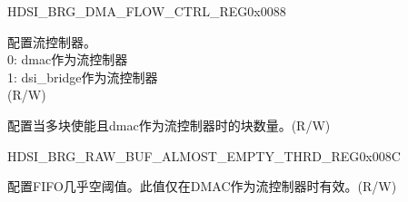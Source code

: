 \begin{register}{H}{DSI\_BRG\_DMA\_FLOW\_CTRL\_REG}{0x0088}\label{regdesc:DSIBRGDMAFLOWCTRLREG}
%
%
%
%
\regnewline%
\begin{regdesc}\begin{reglist}
\label{fielddesc:DSIBRGDSIDMAFLOWCONTROLLER}\item [DSI\_BRG\_DSI\_DMA\_FLOW\_CONTROLLER] 配置流控制器。\\0: dmac作为流控制器\\1: dsi\_bridge作为流控制器 \\(R/W)
\label{fielddesc:DSIBRGDMAFLOWMULTIBLKNUM}\item [DSI\_BRG\_DMA\_FLOW\_MULTIBLK\_NUM] 配置当多块使能且dmac作为流控制器时的块数量。(R/W)
\end{reglist}\end{regdesc}
\end{register}


\begin{register}{H}{DSI\_BRG\_RAW\_BUF\_ALMOST\_EMPTY\_THRD\_REG}{0x008C}\label{regdesc:DSIBRGRAWBUFALMOSTEMPTYTHRDREG}
%
%
\regnewline%
\begin{regdesc}\begin{reglist}
\label{fielddesc:DSIBRGDSIRAWBUFALMOSTEMPTYTHRD}\item [DSI\_BRG\_DSI\_RAW\_BUF\_ALMOST\_EMPTY\_THRD] 配置FIFO几乎空阈值。此值仅在DMAC作为流控制器时有效。(R/W)
\end{reglist}\end{regdesc}
\end{register}


